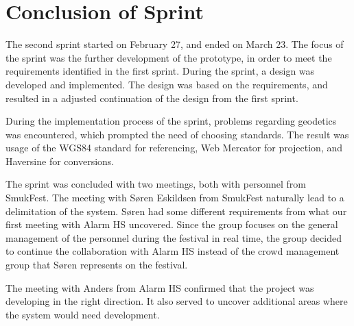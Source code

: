 \section{Conclusion of Sprint}
The second sprint started on February 27, and ended on March 23. The focus of the sprint was the further development of the prototype, in order to meet the requirements identified in the first sprint. During the sprint, a design was developed and implemented. The design was based on the requirements, and resulted in a adjusted continuation of the design from the first sprint.

During the implementation process of the sprint, problems regarding geodetics was encountered, which prompted the need of choosing standards. The result was usage of the WGS84 standard for referencing, Web Mercator for projection, and Haversine for conversions.

The sprint was concluded with two meetings, both with personnel from SmukFest. The meeting with Søren Eskildsen from SmukFest naturally lead to a delimitation of the system. Søren had some different requirements from what our first meeting with Alarm HS uncovered. Since the group focuses on the general management of the personnel during the festival in real time, the group decided to continue the collaboration with Alarm HS instead of the crowd management group that Søren represents on the festival.

The meeting with Anders from Alarm HS confirmed that the project was developing in the right direction. It also served to uncover additional areas where the system would need development.